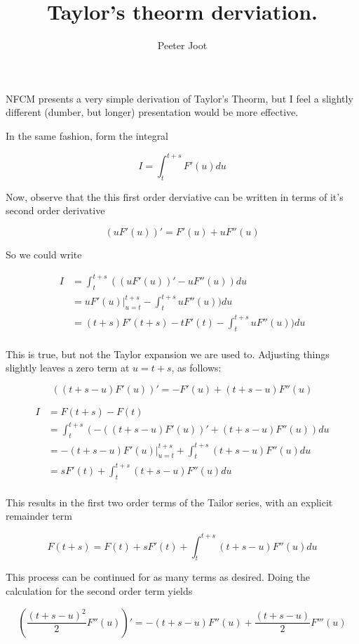 \documentclass{article}      %
\title{Taylor's theorm derviation.} %
\author{Peeter Joot}         %
\begin{document}


NFCM presents a very simple derivation of Taylor's Theorm, but I feel a
slightly different (dumber, but longer) presentation would be more effective.

In the same fashion, form the integral

\[
I = \int_{t}^{t+s} F'(u) du
\]

Now, observe that the this first order derviative can be written in
terms of it's second order derivative

\[
(u F'(u))' = F'(u) + u F''(u)
\]

So we could write

\begin{align*}
I &= \int_{t}^{t+s} ((u F'(u))' - u F''(u)) du \\
  &= {u F'(u)} \vert_{u=t}^{t+s} - \int_{t}^{t+s} u F''(u)) du \\
  &= (t+s) F'(t+s) - t F'(t) - \int_{t}^{t+s} u F''(u)) du \\
\end{align*}

This is true, but not the Taylor expansion we are used to.  Adjusting things slightly leaves a zero term at $u=t+s$, as follows:

\[
\left((t + s - u) F'(u)\right)' = -F'(u) + (t+s-u) F''(u)
\]

\begin{align*}
I &= F(t+s) - F(t) \\
 &= \int_{t}^{t+s} ( - ((t + s - u) F'(u))' + (t+s-u) F''(u) ) du \\
 &= - {(t + s - u) F'(u)} \vert_{u=t}^{t+s} + \int_{t}^{t+s} (t+s-u) F''(u) du \\
 &= s F'(t) + \int_{t}^{t+s} (t+s-u) F''(u) du \\
\end{align*}

This results in the first two order terms of the Tailor series, with an explicit remainder term

\[
F(t+s) = F(t) + s F'(t) + \int_{t}^{t+s} (t+s-u) F''(u) du
\]

This process can be continued for as many terms as desired.  Doing the calculation for the second order term yields

\[
\left(\frac{(t + s - u)^2}{2} F''(u)\right)' = -( t + s - u ) F''(u) + \frac{(t+s-u)}{2} F'''(u)
\]
\end{document}
